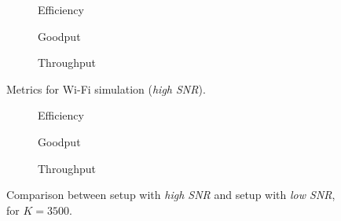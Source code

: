 \begin{figure}[!hp]
\centering
\begin{subfigure}{0.23\textwidth}
	\captionsetup{justification=centering,font=scriptsize}
	\centering
	\setlength\fwidth{\textwidth}
	\setlength{}
	
	\caption{Efficiency}
	\label{fig:wifi_eff}
\end{subfigure}\hspace{2em}%
\begin{subfigure}{0.23\textwidth}
	\captionsetup{justification=centering,font=scriptsize}
	\centering
	\setlength\fwidth{\textwidth}
	\setlength{}
	
	\caption{Goodput}
	\label{fig:wifi_good}
\end{subfigure}\hspace{2em}%
\begin{subfigure}{0.23\textwidth}
	\captionsetup{justification=centering,font=scriptsize}
	\centering
	\setlength\fwidth{\textwidth}
	\setlength{}
	
	\caption{Throughput}
	\label{fig:wifi_thr}
\end{subfigure}
\caption{Metrics for Wi-Fi simulation (\textit{high SNR}).}
\label{fig:wifi}
\end{figure}
\begin{figure}[!hp]
\centering
\begin{subfigure}{0.23\textwidth}
	\captionsetup{justification=centering,font=scriptsize}
	\centering
	\setlength\fwidth{\textwidth}
	\setlength{}
	
	\caption{Efficiency}
	\label{fig:wifi_eff_lsnr_3500}
\end{subfigure}\hspace{2em}%
\begin{subfigure}{0.23\textwidth}
	\captionsetup{justification=centering,font=scriptsize}
	\centering
	\setlength\fwidth{\textwidth}
	\setlength{}
	
	\caption{Goodput}
	\label{fig:wifi_good_lsnr_3500}
\end{subfigure}\hspace{2em}%
\begin{subfigure}{0.23\textwidth}
	\captionsetup{justification=centering,font=scriptsize}
	\centering
	\setlength\fwidth{\textwidth}
	\setlength{}
	
	\caption{Throughput}
	\label{fig:wifi_thr_lsnr_3500}
\end{subfigure}
\caption{Comparison between setup with \textit{high SNR} and setup with \textit{low SNR}, for $K=3500$.}
\label{fig:wifi_lsnr_3500}
\end{figure}
